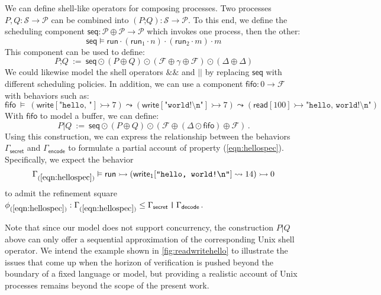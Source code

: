 \documentclass[acmsmall,nonacm]{acmart}
\newcommand{\kw}[1]{\ensuremath{ \mathsf{#1} }}
\newcommand{\emptysig}{0}
\begin{document}
\begin{example}\label{ex:compse-proc} %
We can define shell-like operators for composing processes.
Two processes $P, Q : \mathcal{S} \rightarrow \mathcal{P}$
can be combined into
$(P \mathbin\texttt{;} Q) : \mathcal{S} \rightarrow \mathcal{P}$.
To this end,
we define the scheduling component
$\kw{seq} : \mathcal{P} \oplus \mathcal{P} \rightarrow \mathcal{P}$
which invokes one process, then the other:
\[
  \kw{seq} \vDash
    \kw{run} \cdot (\kw{run}_1 \cdot n) \cdot (\kw{run}_2 \cdot m) \cdot m
\]
This component can be used to define:
\[
  P \mathbin\texttt{;} Q \: := \:
    \kw{seq} \odot (P \oplus Q)
             \odot (\mathcal{F} \oplus \gamma \oplus \mathcal{F})
             \odot (\Delta \oplus \Delta)
\]
We could likewise model the shell operators $\texttt{\&\&}$ and $\texttt{||}$
by replacing $\kw{seq}$ with different scheduling policies.
In addition,
we can use a component
$\kw{fifo} : \emptysig \rightarrow \mathcal{F}$
with behaviors such as:
{\small
\[
  \kw{fifo} \: \vDash \:
    (\kw{write}[\texttt{"hello, "}] \rightarrowtail 7) \leadsto
    (\kw{write}[\texttt{"world!\textbackslash{}n"}] \rightarrowtail 7) \leadsto
    (\kw{read}[100] \rightarrowtail \texttt{"hello, world!\textbackslash{}n"})
\]
}%
With $\kw{fifo}$ to model a buffer,
we can define:
\[
  P \mathbin\texttt{|} Q \: := \:
    \kw{seq} \odot (P \oplus Q)
         \odot (\mathcal{F} \oplus (\Delta \odot \kw{fifo}) \oplus \mathcal{F})
  \,.
\]
Using this construction,
we can express the relationship between the behaviors
$\Gamma_\kw{secret}$ and $\Gamma_\kw{encode}$
to formulate a partial account of property (\ref{eqn:hellospec}).
Specifically,
we expect the behavior
\[
  \Gamma_{(\ref{eqn:hellospec})} \vDash \kw{run}
    \rightarrowtail (\kw{write}_1[\texttt{"hello, world!\textbackslash{}n"}] \leadsto 14)
    \rightarrowtail 0
\]
to admit the refinement square
$
  \phi_{(\ref{eqn:hellospec})} :
  \Gamma_{(\ref{eqn:hellospec})} \le
  \Gamma_\kw{secret} \mathbin{\texttt{|}} \Gamma_\kw{decode}
$.

Note that since our model does not support concurrency,
the construction $P \mathbin{\texttt{|}} Q$ above
can only offer a sequential approximation of
the corresponding Unix shell operator.
We intend the example shown in
\autoref{fig:readwritehello}
to illustrate the issues that come up
when the horizon of verification
is pushed beyond the boundary of a fixed language or model,
but providing a realistic account of Unix processes
remains beyond the scope of the present work.
\end{example}
\end{document}
